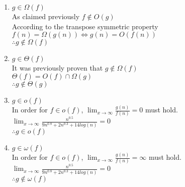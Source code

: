 \documentclass[11pt]{article}
\begin{document}
\begin{enumerate}
			\item $g \in \Omega(f)$ \\
				As claimed previously $ f \notin O(g)$ \\ 
				According to the transpose symmetric property $f(n) = \Omega (g(n)) \Leftrightarrow g(n) = O(f(n)) $ \\
				$\therefore g \notin \Omega (f)$
			
			\item $g \in \Theta(f)$ \\
				It was previously proven that $g \notin \Omega(f)$ \\
				$\Theta(f) = O(f) \cap \Omega(g)$\\
				$\therefore g \notin \Theta (g)$
				
			\item $g \in o(f)$ \\
				In order for $f \in o(f)$, $\lim_{x \to \infty} \frac{g(n)}{f(n)} = 0$	must hold. \\
				$\lim_{x \to \infty} \frac{n^{0.5}}{9n^{0.8} + 2n^{0.3} + 14log(n)} = 0 $\\
				$\therefore g \in o(f)$
				
			\item $g \in \omega(f)$ \\
				In order for $f \in o(f)$, $\lim_{x \to \infty} \frac{g(n)}{f(n)} = \infty$	must hold. \\
				$\lim_{x \to \infty} \frac{n^{0.5}}{9n^{0.8} + 2n^{0.3} + 14log(n)} = 0 $\\
				$\therefore g \notin \omega(f)$
		\end{enumerate}
		
		
\end{document}
